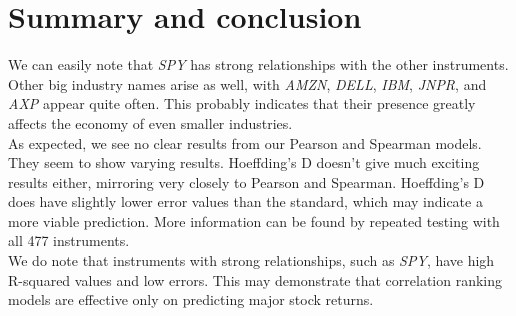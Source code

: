 \documentclass[10pt]{siamltex}
\begin{document}
\section{Summary and conclusion}  \label{sec:conclusion}
 We can easily note that \textit{SPY} has strong relationships with the other instruments. Other big industry names arise as well, with \textit{AMZN}, \textit{DELL}, \textit{IBM}, \textit{JNPR}, and \textit{AXP} appear quite often. This probably indicates that their presence greatly affects the economy of even smaller industries. \vspace{5mm} \\
As expected, we see no clear results from our Pearson and Spearman models. They seem to show varying results. Hoeffding's D doesn't give much exciting results either, mirroring very closely to Pearson and Spearman. Hoeffding's D does have slightly lower error values than the standard, which may indicate a more viable prediction. More information can be found by repeated testing with all 477 instruments. \vspace{5mm} \\
We do note that instruments with strong relationships, such as \textit{SPY}, have high R-squared values and low errors. This may demonstrate that correlation ranking models are effective only on predicting major stock returns. \vspace{5mm} \\




\end{document}

